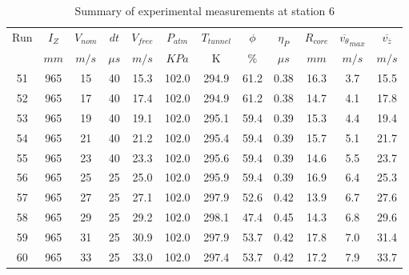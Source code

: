 \begin{table}[H]
\begin{center}
\begin{tabular}{|cccccccccccc|}
	\hline
	Run & $I_Z$ & $V_{nom}$ & $dt$ & $V_{free}$ & $P_{atm}$ & $T_{tunnel}$ & $\phi$ & $\eta_P$ & $R_{core}$ & $\overline{v_{\theta}}_{max}$ & $\overline{v_{\bar{z}}}$\\
	  & $mm$ & $m/s$ & $\mu s$ & $m/s$ & $KPa$ & K & $\%$ & $\mu s$ & $mm$ & $m/s$ & $m/s$\\
	\hline
	51 & 965 & 15 & 40 & 15.3 & 102.0 & 294.9 & 61.2 & 0.38 & 16.3 & 3.7 & 15.5\\
	52 & 965 & 17 & 40 & 17.4 & 102.0 & 294.9 & 61.2 & 0.38 & 14.7 & 4.1 & 17.8\\
	53 & 965 & 19 & 40 & 19.1 & 102.0 & 295.1 & 59.4 & 0.39 & 15.3 & 4.4 & 19.4\\
	54 & 965 & 21 & 40 & 21.2 & 102.0 & 295.4 & 59.4 & 0.39 & 15.7 & 5.1 & 21.7\\
	55 & 965 & 23 & 40 & 23.3 & 102.0 & 295.6 & 59.4 & 0.39 & 14.6 & 5.5 & 23.7\\
	56 & 965 & 25 & 25 & 25.0 & 102.0 & 295.9 & 59.4 & 0.39 & 16.9 & 6.4 & 25.3\\
	57 & 965 & 27 & 25 & 27.1 & 102.0 & 297.9 & 52.6 & 0.42 & 13.9 & 6.7 & 27.6\\
	58 & 965 & 29 & 25 & 29.2 & 102.0 & 298.1 & 47.4 & 0.45 & 14.3 & 6.8 & 29.6\\
	59 & 965 & 31 & 25 & 30.9 & 102.0 & 297.9 & 53.7 & 0.42 & 17.8 & 7.0 & 31.4\\
	60 & 965 & 33 & 25 & 33.0 & 102.0 & 297.4 & 53.7 & 0.42 & 17.2 & 7.9 & 33.7\\
	\hline
\end{tabular}
\caption{Summary of experimental measurements at station 6}
\label{table:experiment_results_6}
\end{center}
\end{table}
